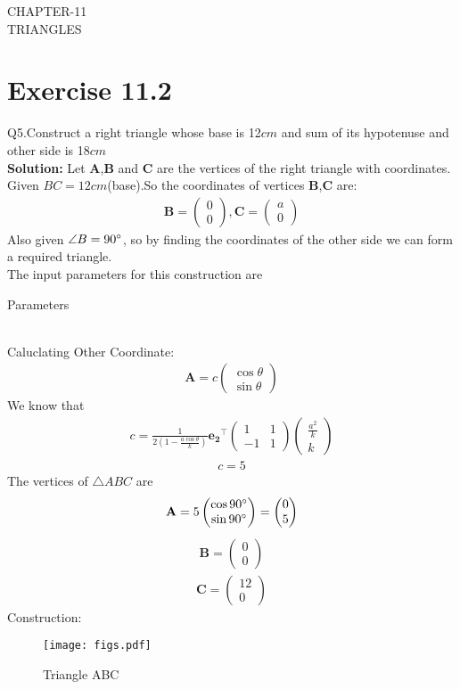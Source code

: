 \documentclass{article}
\newcommand{\myvec}[1]{\ensuremath{\begin{pmatrix}#1\end{pmatrix}}}
\let\vec\mathbf
\begin{document}
\begin{center}
        \textbf\large{CHAPTER-11 \\ TRIANGLES}
\end{center}
\section{Exercise 11.2}
Q5.Construct a right triangle whose base is 12$cm$ and sum of its hypotenuse and other side is 18$cm$ \\
\textbf{Solution:}
Let $\vec{A}$,$\vec{B}$ and $\vec{C}$ are the vertices of the right triangle with coordinates.
Given $BC=12cm$(base).So the coordinates of vertices $\vec{B}$,$\vec{C}$ are:
\begin{align}
{
\vec{B} =\myvec{0\\0},\vec{C} =\myvec{a\\0}
}
\end{align}
Also given $\angle{B}=90\degree$, so by finding the coordinates of the other side we can form a required triangle. \\
 The input parameters for this construction are
 \begin{table}[h]
   \centering
   
   \caption{Parameters}
   \label{tab:Table1}
\end{table}\\
Caluclating Other Coordinate:
  \begin{align}
	  \vec{A} = c\myvec{\cos{\theta} \\ \sin{\theta}}
   \end{align}
We know that\\
\begin{align}  
	c = \frac{1}{2(1-\frac{a\cos{\theta}}{k})}\vec{e_2}^{\top}\myvec{1 & 1\\-1 & 1}\myvec{\frac{a^2}{k}\\k}
     \end{align}
  \begin{align}
	  c = 5
  \end{align}  
The vertices of $\triangle ABC$ are \\
\begin{align}
\vec{A} = 5\myvec{\cos 90\degree\\\sin 90\degree}
  = \myvec{0\\5}
\end{align}
\begin{align}
 \vec{B} = \myvec{0\\0}
\end{align}
\begin{align}
 \vec{C} = \myvec{12\\0}
 \end{align}        
Construction: 
\begin{figure}[h]
 \begin{center}
  \texttt{[image: figs.pdf]}
 \end{center}
 \caption{Triangle ABC}
 \label{fig:Fig1}
\end{figure}
\end{document}
